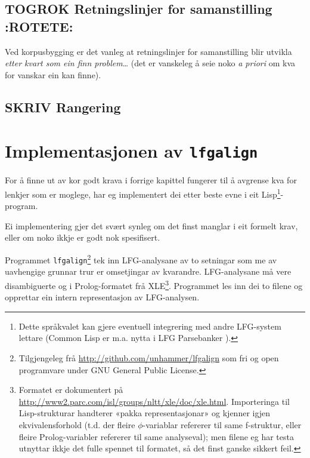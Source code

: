 \documentclass[11pt,a4paper,oneside,draft]{book}
\begin{document}
\section{\textbf{TOGROK} Retningslinjer for samanstilling \textbf{:ROTETE:}}
\label{sec-3.21}

Ved korpusbygging er det vanleg at retningslinjer for samanstilling
blir utvikla \emph{etter kvart som ein finn problem}\ldots{} (det er vanskeleg å
seie noko \emph{a priori} om kva for vanskar ein kan finne).


\section{\textbf{SKRIV} Rangering}
\label{sec-3.22}


\chapter{Implementasjonen av \texttt{lfgalign}}
\label{sec-4}

\label{SEC:implementasjon}

For å finne ut av kor godt krava i forrige kapittel fungerer til å
avgrense kva for lenkjer som er moglege, har eg implementert dei etter
beste evne i eit Lisp\footnote{Dette språkvalet kan gjere eventuell integrering med andre
        LFG-system lettare (Common Lisp er m.a. nytta i LFG
        Parsebanker \citep{rosen2009lpt}). }-program.

 Ei implementering gjer det svært synleg om det finst
manglar i eit formelt krav, eller om noko ikkje er godt nok
spesifisert.

Programmet \texttt{lfgalign}\footnote{Tilgjengeleg frå \href{http://github.com/unhammer/lfgalign}{http://github.com/unhammer/lfgalign} som fri og
       open programvare under GNU General Public License. } tek inn LFG-analysane av to
setningar som me av uavhengige grunnar trur er omsetjingar av
kvarandre. LFG-analysane må vere disambiguerte og i Prolog-formatet
frå XLE\footnote{Formatet er dokumentert på
       \href{http://www2.parc.com/isl/groups/nltt/xle/doc/xle.html}{http://www2.parc.com/isl/groups/nltt/xle/doc/xle.html}. Importeringa
       til Lisp-strukturar handterer «pakka representasjonar» og
       kjenner igjen ekvivalensforhold (t.d. der fleire
       $\phi$-variablar refererer til same f-struktur, eller fleire
       Prolog-variabler refererer til same analyseval); men filene eg
       har testa utnyttar ikkje det fulle spennet til formatet, så det
       finst ganske sikkert feil. }. Programmet les inn dei to filene og opprettar ein
intern representasjon av LFG-analysen.  
\end{document}

